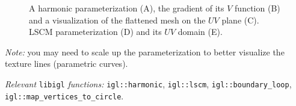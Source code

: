 \documentclass[11pt]{amsart}
\begin{document}
\begin{figure}[h!]
   \centering
   \caption{A harmonic parameterization (A), the gradient of its $V$ function
    (B) and a visualization of the flattened mesh on the $UV$ plane (C). LSCM
    parameterization (D) and its $UV$ domain (E).} \label{fig:harmonic_lscm}
\end{figure}

\emph{Note:} you may need to scale up the parameterization to better visualize
the texture lines (parametric curves).

\emph{Relevant} \texttt{libigl} \emph{functions: } \texttt{igl::harmonic},
\texttt{igl::lscm}, \texttt{igl::boundary\_loop},
\\\texttt{igl::map\_vertices\_to\_circle}.
\end{document}
